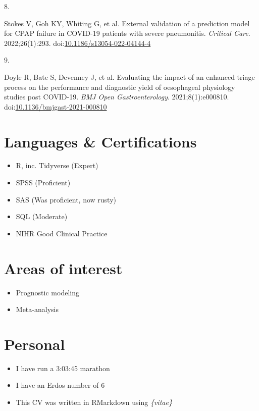 \documentclass[11pt,a4paper,]{awesome-cv}
\providecommand{\tightlist}{%
	\setlength{\itemsep}{0pt}\setlength{\parskip}{0pt}}
\newlength{\cslhangindent}
\newlength{\csllabelwidth}
\newenvironment{CSLReferences}[2] %
 {\begin{list}{}{%
  \setlength{\itemindent}{0pt}
  \setlength{\leftmargin}{0pt}
  \setlength{\parsep}{0pt}
  \ifodd #1
   \setlength{\leftmargin}{\cslhangindent}
   \setlength{\itemindent}{-1\cslhangindent}
  \fi
  \setlength{\itemsep}{#2\baselineskip}}}
 {\end{list}}
\newcommand{\CSLLeftMargin}[1]{\parbox[t]{\csllabelwidth}{\strut#1\strut}}
\newcommand{\CSLRightInline}[1]{\parbox[t]{\linewidth - \csllabelwidth}{\strut#1\strut}}
\begin{document}
\begin{CSLReferences}{0}{0}
\leavevmode{}%
\CSLLeftMargin{8. }%
\CSLRightInline{Stokes V, Goh KY, Whiting G, et al. External validation
of a prediction model for CPAP failure in COVID-19 patients with severe
pneumonitis. \emph{Critical Care}. 2022;26(1):293.
doi:\href{https://doi.org/10.1186/s13054-022-04144-4}{10.1186/s13054-022-04144-4}}

\leavevmode{}%
\CSLLeftMargin{9. }%
\CSLRightInline{Doyle R, Bate S, Devenney J, et al. Evaluating the
impact of an enhanced triage process on the performance and diagnostic
yield of oesophageal physiology studies post COVID-19. \emph{BMJ Open
Gastroenterology}. 2021;8(1):e000810.
doi:\href{https://doi.org/10.1136/bmjgast-2021-000810}{10.1136/bmjgast-2021-000810}}

\end{CSLReferences}

\hypertarget{languages-certifications}{%
\section{Languages \& Certifications}\label{languages-certifications}}

\begin{itemize}
\tightlist
\item
  R, inc. Tidyverse (Expert)
\item
  SPSS (Proficient)
\item
  SAS (Was proficient, now rusty)
\item
  SQL (Moderate)
\item
  NIHR Good Clinical Practice
\end{itemize}

\hypertarget{areas-of-interest}{%
\section{Areas of interest}\label{areas-of-interest}}

\begin{itemize}
\tightlist
\item
  Prognostic modeling
\item
  Meta-analysis
\end{itemize}

\hypertarget{personal}{%
\section{Personal}\label{personal}}

\begin{itemize}
\tightlist
\item
  I have run a 3:03:45 marathon
\item
  I have an Erdos number of 6
\item
  This CV was written in RMarkdown using \emph{\{vitae\}}
\end{itemize}


\label{LastPage}~
\end{document}
